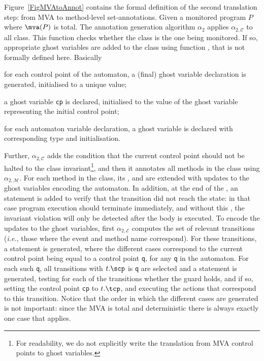 Figure~\ref{FigMVAtoAnnot} contains the formal definition of the
second translation step: from MVA to method-level
set-annotations. Given a monitored program \(P\) where \(\mva(P)\) is
total. The annotation generation algorithm \(\alpha_2\) applies
\(\alpha_{2, \mathcal{C}}\) to all
class. This function checks whether the class is the one being
monitored. If so, appropriate ghost variables are added to the class
using function \newgvs, that is not formally defined here. Basically 
\begin{inparaenum}
\item for each control point of the automaton, a (final) ghost
variable declaration is generated, initialised to a unique value;
\item a ghost variable \texttt{cp} is declared, initialised to the
value of the ghost variable representing the initial control point;
\item for each automaton variable declaration, a ghost variable is
declared with corresponding type and initialisation.
\end{inparaenum}
Further, \(\alpha_{2, \mathcal{C}}\) adds the condition that the
current control point should not be halted to the class
invariant\footnote{For readability, we do not explicitly write the
translation from MVA control points to ghost variables.}, and then it
annotates all methods in the class using \(\alpha_{2,
\mathcal{M}}\). For each method in the class, its \preset, \postset
and \excset are extended with updates to the ghost variables encoding
the automaton. In addition, at the end of the \preset, an \Assert
statement is added to verify that the transition did not reach the
\halted state: in that case program execution should terminate
immediately, and without this \Assert, the invariant violation will
only be detected after the body is executed. To encode the updates to
the ghost variables, first \(\alpha_{2, \mathcal{E}}\) computes the
set of relevant transitions (\emph{i.e.}, those where the event and
method name correspond). For these transitions, a \CaseJML
statement is generated, where the different cases correspond to the current
control point being equal to a control point \texttt{q}, for any
\texttt{q} in the automaton. For each such \texttt{q}, all transitions
with \(t.\scp\) is \texttt{q} are selected and a \CaseJML
statement is generated, testing for each of the transitions whether
the guard holds, and if so, setting the control point \texttt{cp} to
\(t.\tcp\), and executing the actions that correspond to this
transition. 
Notice that the order in which the different cases are generated is
not important: since the MVA is total and deterministic there is
always exactly one case that applies.




